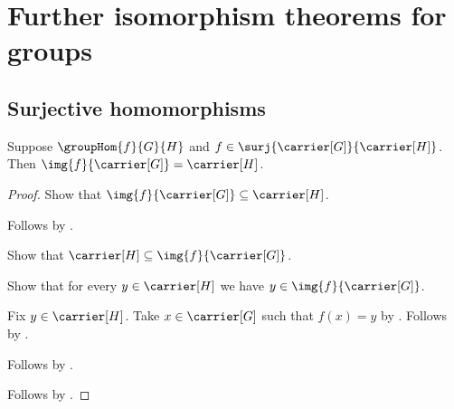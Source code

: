 




\section{Further isomorphism theorems for groups}

\subsection{Surjective homomorphisms}

\begin{proposition}\label{surjective_group_hom_image_full}
    Suppose $\groupHom{f}{G}{H}$ and
        $f\in\surj{\carrier[G]}{\carrier[H]}$.
    Then $\img{f}{\carrier[G]}=\carrier[H]$.
\end{proposition}
\begin{proof}
    Show that $\img{f}{\carrier[G]}\subseteq\carrier[H]$.
    \begin{subproof}
        Follows by
            .
    \end{subproof}
    Show that $\carrier[H]\subseteq\img{f}{\carrier[G]}$.
    \begin{subproof}
        Show that for every $y\in\carrier[H]$ we have
            $y\in\img{f}{\carrier[G]}$.
        \begin{subproof}
            Fix $y\in\carrier[H]$.
            Take $x\in\carrier[G]$ such that $f(x)=y$ by
                .
            Follows by
                .
        \end{subproof}
        Follows by .
    \end{subproof}
    Follows by .
\end{proof}


